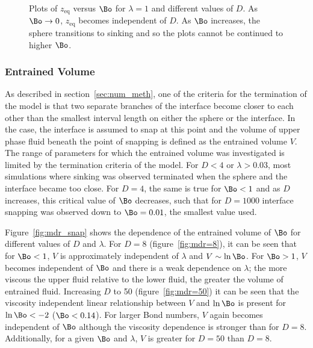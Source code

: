{  \begin{figure}
    \resizebox{0.9\textwidth}{!}{\large }
    \caption{Plots of $z_{\text{eq}}$ versus $\Bo$ for $\lambda = 1$ and different values of $D$. As $\Bo \to 0$, $z_{\text{eq}}$ becomes independent of $D$. As $\Bo$ increases, the sphere transitions to sinking and so the plots cannot be continued to higher $\Bo$. \label{fig:fin_pos}}
  \end{figure}

\subsubsection{Entrained Volume}
\label{subsubsec:ent_vol_res}

As described in section~\ref{sec:num_meth}, one of the criteria for the termination of the model is that two separate branches of the interface become closer to each other than the smallest interval length on either the sphere or the interface. In the case, the interface is assumed to snap at this point and the volume of upper phase fluid beneath the point of snapping is defined as the entrained volume $V$. The range of parameters for which the entrained volume was investigated is limited by the termination criteria of the model. For $D < 4$ or $\lambda > 0.03$, most simulations where sinking was observed terminated when the sphere and the interface became too close. For $D = 4$, the same is true for $\Bo <1$ and as $D$ increases, this critical value of $\Bo$ decreases, such that for $D = 1000$ interface snapping was observed down to $\Bo = 0.01$, the smallest value used.

Figure~\ref{fig:mdr_snap} shows the dependence of the entrained volume of $\Bo$ for different values of $D$ and $\lambda$. For $D = 8$ (figure~\ref{fig:mdr=8}), it can be seen that for $\Bo < 1$, $V$ is approximately independent of $\lambda$ and $V \sim \ln\Bo$. For $\Bo > 1$, $V$ becomes independent of $\Bo$ and there is a weak dependence on $\lambda$; the more viscous the upper fluid relative to the lower fluid, the greater the volume of entrained fluid. Increasing $D$ to 50 (figure~\ref{fig:mdr=50}) it can be seen that the viscosity independent linear relationship between $V$ and $\ln\Bo$ is present for $\ln \Bo < -2$ ($\Bo < 0.14$). For larger Bond numbers, $V$ again becomes independent of $\Bo$ although the viscosity dependence is stronger than for $D = 8$. Additionally, for a given $\Bo$ and $\lambda$, $V$ is greater for $D = 50$ than $D = 8$.

}
